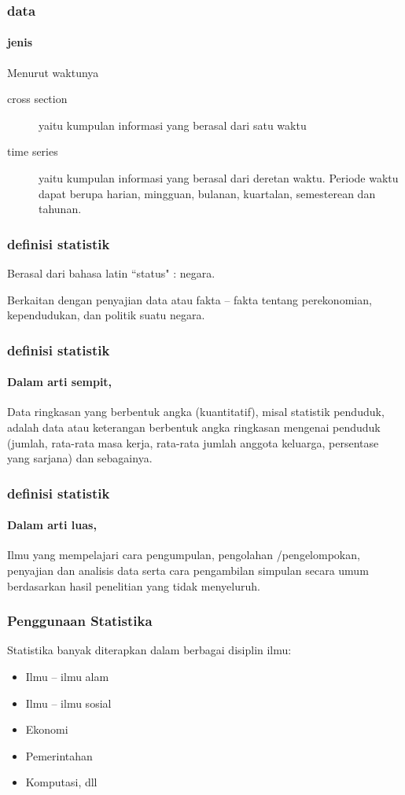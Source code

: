 \documentclass[main.tex]{subfiles}
\begin{document}
\begin{frame}[c]
	\frametitle{data}
	\framesubtitle{jenis}
	Menurut waktunya
	\begin{description}
		\item[cross section] yaitu kumpulan informasi yang berasal dari satu waktu
		\item[time series] yaitu kumpulan informasi yang berasal dari deretan waktu. Periode waktu dapat berupa harian, mingguan, bulanan, kuartalan, semesterean dan tahunan.
	\end{description}
\end{frame}

\begin{frame}[c]
	\frametitle{definisi statistik}
	\begin{block}{}
		Berasal dari bahasa latin ``status" : negara.
	\end{block}
	\begin{block}{}
		Berkaitan dengan penyajian data atau fakta – fakta tentang perekonomian, kependudukan, dan politik suatu negara.
	\end{block}
\end{frame}

\begin{frame}[c]
	\frametitle{definisi statistik}
	\framesubtitle{Dalam arti sempit,}
	Data ringkasan yang berbentuk angka (kuantitatif), misal statistik penduduk, adalah data atau keterangan berbentuk angka ringkasan mengenai penduduk (jumlah, rata-rata masa kerja, rata-rata jumlah anggota keluarga, persentase yang sarjana) dan sebagainya.
\end{frame}

\begin{frame}[c]
	\frametitle{definisi statistik}
	\framesubtitle{Dalam arti luas,}
	Ilmu yang mempelajari cara pengumpulan, pengolahan /pengelompokan, penyajian dan analisis data serta cara pengambilan simpulan secara umum berdasarkan hasil penelitian yang tidak menyeluruh.
\end{frame}

\begin{frame}[c]
	\frametitle{Penggunaan Statistika}
	Statistika banyak diterapkan dalam berbagai disiplin ilmu:

	\begin{itemize}
		\item Ilmu – ilmu alam
		\item Ilmu – ilmu sosial
		\item Ekonomi
		\item Pemerintahan
		\item Komputasi, dll
	\end{itemize}
\end{frame}
\end{document}
